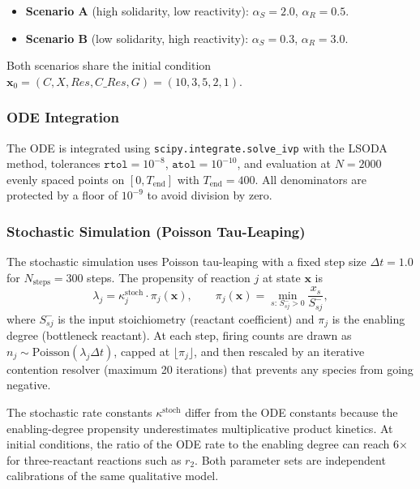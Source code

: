 \begin{itemize}
    \item \textbf{Scenario A} (high solidarity, low reactivity):
          $\alpha_S = 2.0$, $\alpha_R = 0.5$.
    \item \textbf{Scenario B} (low solidarity, high reactivity):
          $\alpha_S = 0.3$, $\alpha_R = 3.0$.
\end{itemize}

Both scenarios share the initial condition
$\mathbf{x}_0 = (C, X, \textit{Res}, C\_\textit{Res}, G) = (10, 3, 5, 2, 1)$.

\subsubsection*{ODE Integration}

The ODE is integrated using \texttt{scipy.integrate.solve\_ivp} with the
LSODA method, tolerances $\texttt{rtol}=10^{-8}$, $\texttt{atol}=10^{-10}$,
and evaluation at $N = 2000$ evenly spaced points on $[0, T_{\text{end}}]$
with $T_{\text{end}} = 400$.
All denominators are protected by a floor of $10^{-9}$ to avoid division by zero.

\subsubsection*{Stochastic Simulation (Poisson Tau-Leaping)}

The stochastic simulation uses Poisson tau-leaping with a fixed step size
$\Delta t = 1.0$ for $N_{\text{steps}} = 300$ steps.
The propensity of reaction $j$ at state $\mathbf{x}$ is
\begin{equation}
    \lambda_j = \kappa^{\text{stoch}}_j \cdot \pi_j(\mathbf{x}),
    \qquad
    \pi_j(\mathbf{x}) = \min_{s:\,S^-_{sj}>0} \frac{x_s}{S^-_{sj}},
    \label{eq:s3_propensity}
\end{equation}
where $S^-_{sj}$ is the input stoichiometry (reactant coefficient) and
$\pi_j$ is the enabling degree (bottleneck reactant).  At each step,
firing counts are drawn as $n_j \sim \mathrm{Poisson}(\lambda_j \Delta t)$,
capped at $\lfloor\pi_j\rfloor$, and then rescaled by an iterative contention
resolver (maximum 20 iterations) that prevents any species from going negative.

The stochastic rate constants $\kappa^{\text{stoch}}$ differ from the ODE
constants because the enabling-degree propensity underestimates multiplicative
product kinetics.  At initial conditions, the ratio of the ODE rate to the
enabling degree can reach 6$\times$ for three-reactant reactions such as $r_2$.
Both parameter sets are independent calibrations of the same qualitative model.


